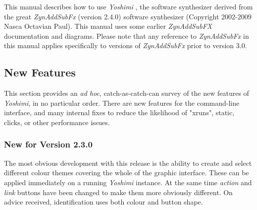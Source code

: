 \documentclass[
 11pt,
 twoside,
 a4paper,
 final                                 %
]{article}
\begin{document}
   This manual describes how to use \textsl{Yoshimi} \cite{yoshimi},
   the software synthesizer derived from the great
   \textsl{ZynAddSubFx} (version 2.4.0) \cite{zynaddsubfx} software
   synthesizer (Copyright 2002-2009 Nasca Octavian Paul).
   This manual uses some earlier \textsl{ZynAddSubFX} documentation and
   diagrams.  Please note that any reference to \textsl{ZynAddSubFx}
   in this manual applies specifically to versions of \textsl{ZynAddSubFx}
   prior to version 3.0.

%
%

\subsection{New Features}
\label{subsec:introduction_new_features}

   This section provides an \textsl{ad hoc}, catch-as-catch-can survey of the
   new features of \textsl{Yoshimi}, in no particular order.
   There are new features for the command-line interface, and many internal
   fixes to reduce the likelihood of "xruns", static, clicks, or other
   performance issues.

\subsubsection{New for Version 2.3.0}
\label{subsubsec:new_features_2_3_0}
The most obvious development with this release is the ability to create and select different colour themes covering the whole of the graphic interface. These can be applied immediately on a running \textsl{Yoshimi} instance. At the same time \textsl{action} and \textsl{link} buttons have been changed to make them more obviously different. On advice received, identification uses both colour and button shape.
\end{document}
